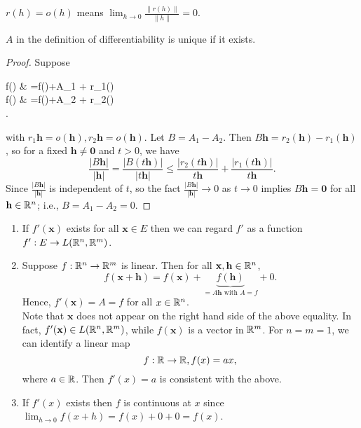 \begin{notation}
	$r(h)=o(h)$ means $\lim_{h\to 0}{\frac{\|r(h)\|}{\|h\|}}=0$.
\end{notation}

\begin{thm}[12]
	$A$ in the definition of differentiability is unique if it exists.
	\begin{proof}
		Suppose
		\begin{flalign*}
			f() & =f()+A_{1} + r_{1}() \\
			f() & =f()+A_{2} + r_{2}() \\
			.\end{flalign*}
		with $r_{1}\mathbf{h}=o(\mathbf{h}), r_{2}\mathbf{h}=o(\mathbf{h})$.
		Let $B=A_{1}-A_{2}$. Then $B\mathbf{h}=r_{2}(\mathbf{h})-r_{1}(\mathbf{h})$, so for a fixed $\mathbf{h}\neq \mathbf{0}$ and $t>0$, we have
		\[
			\frac{\left|B\mathbf{h}\right|}{\left|\mathbf{h}\right|}= \frac{\left|B(t \mathbf{h})\right|}{\left|t \mathbf{h}\right|} \le \frac{\left|r_{2}(t \mathbf{h})\right|}{t \mathbf{h}}+\frac{\left|r_{1}(t \mathbf{h})\right|}{t \mathbf{h}}.\]
		Since $\frac{\left|B \mathbf{h}\right|}{\left| \mathbf{h}\right|}$ is independent of $t$, so the fact $\frac{\left|B \mathbf{h}\right|}{\left| \mathbf{h}\right|}\to 0$ as $t\to 0$ implies $B \mathbf{h}=\mathbf{0}$ for all $\mathbf{h} \in \mathbb{R}^{n}$; i.e., $B=A_{1}-A_{2}=0$.
	\end{proof}
	\begin{note}
		\begin{enumerate}
			\item If $f'(\mathbf{x})$ exists for all $\mathbf{x} \in E$ then we can regard $f'$ as a function $f':E\to L(\mathbb{R}^{n},\mathbb{R}^{m})$.
			\item Suppose $f: \mathbb{R}^{n}\to \mathbb{R}^{m}$ is linear. Then for all $\mathbf{x}, \mathbf{h} \in \mathbb{R}^{n}$,
			      \[
				      f(\mathbf{x+h})=f(\mathbf{x})+\underbrace{f(\mathbf{h})}_{=A \mathbf{h} \text{ with } A=f}+0
				      .\]
			      Hence, $f'(\mathbf{x})=A=f$ for all $x \in \mathbb{R}^{n}$.\\
			      Note that $\mathbf{x}$ does not appear on the right hand side of the above equality. In fact, $f'(\mathbf{x}) \in L(\mathbb{R}^{n}, \mathbb{R}^{m})$, while $f(\mathbf{x})$ is a vector in $\mathbb{R}^{m}$.
			      For $n=m=1$, we can identify a linear map
			      \[
				      f: \mathbb{R}\to \mathbb{R}, f(x)=ax
				      ,\]
			      where $a \in \mathbb{R}$.
			      Then $f'(x)=a$ is consistent with the above.
			\item
			      If $f'(x)$ exists then $f$ is continuous at $x$ since $\lim_{h\to 0}{f(x+h)}=f(x)+0+0=f(x)$.
		\end{enumerate}
	\end{note}
\end{thm}


